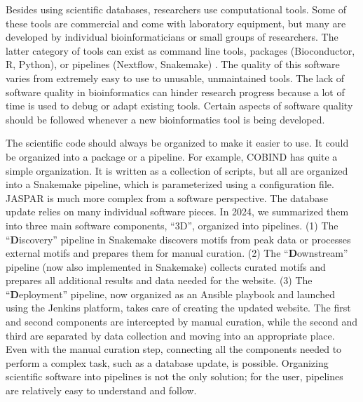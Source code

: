     Besides using scientific databases, researchers use computational tools. Some of these tools are commercial and come with laboratory equipment, but many are developed by individual bioinformaticians or small groups of researchers. The latter category of tools can exist as command line tools, packages (Bioconductor, R, Python), or pipelines (Nextflow, Snakemake) \cite{gentleman2004bioconductor,r2023language,python2009language,di2017nextflow,molder2021sustainable}. The quality of this software varies from extremely easy to use to unusable, unmaintained tools. The lack of software quality in bioinformatics can hinder research progress because a lot of time is used to debug or adapt existing tools. Certain aspects of software quality should be followed whenever a new bioinformatics tool is being developed.

    The scientific code should always be organized to make it easier to use. It could be organized into a package or a pipeline. For example, COBIND has quite a simple organization. It is written as a collection of scripts, but all are organized into a Snakemake pipeline, which is parameterized using a configuration file. JASPAR is much more complex from a software perspective. The database update relies on many individual software pieces. In 2024, we summarized them into three main software components, ``3D'', organized into pipelines. (1) The ``\textbf{D}iscovery'' pipeline in Snakemake discovers motifs from peak data or processes external motifs and prepares them for manual curation. (2) The ``\textbf{D}ownstream'' pipeline (now also implemented in Snakemake) collects curated motifs and prepares all additional results and data needed for the website. (3) The ``\textbf{D}eployment'' pipeline, now organized as an Ansible playbook and launched using the Jenkins platform, takes care of creating the updated website. The first and second components are intercepted by manual curation, while the second and third are separated by data collection and moving into an appropriate place. Even with the manual curation step, connecting all the components needed to perform a complex task, such as a database update, is possible. Organizing scientific software into pipelines is not the only solution; for the user, pipelines are relatively easy to understand and follow.

